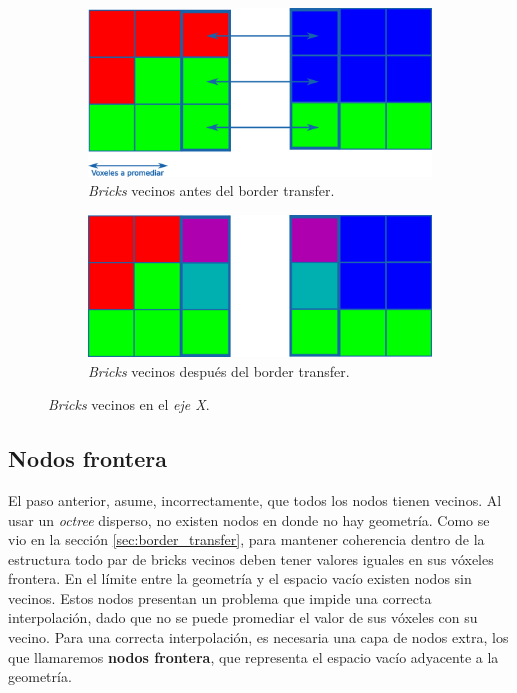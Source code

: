 \begin{figure}[h!]
    \centering
    \begin{subfigure}{1.0\textwidth}
        \centering
        \includegraphics[width=1.0\textwidth]{border-transfer.png}
        \caption{\textit{Bricks} vecinos antes del border transfer.}
    \end{subfigure}
    \begin{subfigure}{1.0\textwidth}
        \centering
        \includegraphics[width=1.0\textwidth]{border-transfer-b.png}
        \caption{\textit{Bricks} vecinos después del border transfer.}
    \end{subfigure}
    \caption{\textit{Bricks} vecinos en el \textit{eje X}.}
    \label{fig:border_transfer}
\end{figure}

\subsection{Nodos frontera}

El paso anterior, asume, incorrectamente, que todos los nodos tienen vecinos.
Al usar un \textit{octree} disperso, no existen nodos en donde no hay geometría.
Como se vio en la sección \ref{sec:border_transfer}, para mantener coherencia dentro de la estructura todo par de bricks vecinos deben tener valores iguales en sus vóxeles frontera.
En el límite entre la geometría y el espacio vacío existen nodos sin vecinos.
Estos nodos presentan un problema que impide una correcta interpolación, dado que no se puede promediar el valor de sus vóxeles con su vecino.
Para una correcta interpolación, es necesaria una capa de nodos extra, los que llamaremos \textbf{nodos frontera}, que representa el espacio vacío adyacente a la geometría.

